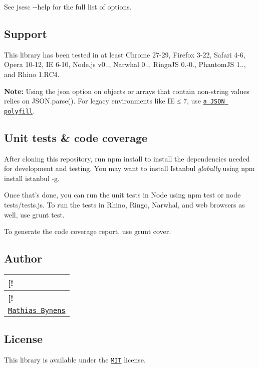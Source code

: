 See {\ttfamily jsesc -\/-\/help} for the full list of options.

\subsection*{Support}

This library has been tested in at least Chrome 27-\/29, Firefox 3-\/22, Safari 4-\/6, Opera 10-\/12, IE 6-\/10, Node.\+js v0.., Narwhal 0.., Ringo\+JS 0.-\/0., Phantom\+JS 1.., and Rhino 1.\+R\+C4.

{\bfseries Note\+:} Using the {\ttfamily json} option on objects or arrays that contain non-\/string values relies on {\ttfamily J\+S\+O\+N.\+parse()}. For legacy environments like IE ≤ 7, use \href{http://bestiejs.github.io/json3/}{\tt a {\ttfamily J\+S\+ON} polyfill}.

\subsection*{Unit tests \& code coverage}

After cloning this repository, run {\ttfamily npm install} to install the dependencies needed for development and testing. You may want to install Istanbul {\itshape globally} using {\ttfamily npm install istanbul -\/g}.

Once that’s done, you can run the unit tests in Node using {\ttfamily npm test} or {\ttfamily node tests/tests.\+js}. To run the tests in Rhino, Ringo, Narwhal, and web browsers as well, use {\ttfamily grunt test}.

To generate the code coverage report, use {\ttfamily grunt cover}.

\subsection*{Author}

\tabulinesep=1mm
\begin{longtabu} spread 0pt [c]{*{1}{|X[-1]}|}
\hline
\rowcolor{\tableheadbgcolor}\textbf{ \mbox{[}!   }\\
\endfirsthead
\hline
\endfoot
\hline
\rowcolor{\tableheadbgcolor}\textbf{ \mbox{[}!   }\\
\endhead
\href{http://mathiasbynens.be/}{\tt Mathias Bynens}   \\
\end{longtabu}


\subsection*{License}

This library is available under the \href{http://mths.be/mit}{\tt M\+IT} license. 